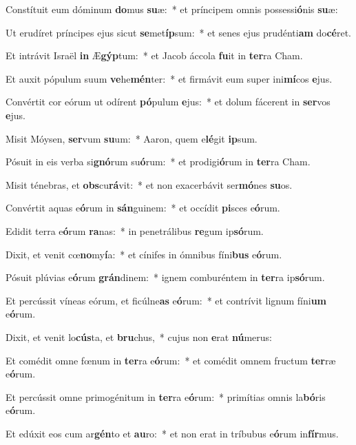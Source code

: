 \item Constítuit eum dóminum \textbf{do}mus \textbf{su}æ:~* et príncipem omnis possessi\textbf{ó}nis \textbf{su}æ:
\item Ut erudíret príncipes ejus sicut \textbf{se}met\textbf{íp}sum:~* et senes ejus prudénti\textbf{am} do\textbf{cé}ret.
\item Et intrávit Israël \textbf{in} Æ\textbf{gýp}tum:~* et Jacob áccola \textbf{fu}it in \textbf{ter}ra Cham.
\item Et auxit pópulum suum \textbf{ve}he\textbf{mén}ter:~* et firmávit eum super ini\textbf{mí}cos \textbf{e}jus.
\item Convértit cor eórum ut odírent \textbf{pó}pulum \textbf{e}jus:~* et dolum fácerent in \textbf{ser}vos \textbf{e}jus.
\item Misit Móysen, \textbf{ser}vum \textbf{su}um:~* Aaron, quem e\textbf{lé}git \textbf{ip}sum.
\item Pósuit in eis verba si\textbf{gnó}rum su\textbf{ó}rum:~* et prodigi\textbf{ó}rum in \textbf{ter}ra Cham.
\item Misit ténebras, et \textbf{obs}cu\textbf{rá}vit:~* et non exacerbávit ser\textbf{mó}nes \textbf{su}os.
\item Convértit aquas e\textbf{ó}rum in \textbf{sán}guinem:~* et occídit \textbf{pi}sces e\textbf{ó}rum.
\item Edidit terra e\textbf{ó}rum \textbf{ra}nas:~* in penetrálibus \textbf{re}gum ip\textbf{só}rum.
\item Dixit, et venit cœ\textbf{no}my\textbf{í}a:~* et cínifes in ómnibus fíni\textbf{bus} e\textbf{ó}rum.
\item Pósuit plúvias e\textbf{ó}rum \textbf{grán}dinem:~* ignem comburéntem in \textbf{ter}ra ip\textbf{só}rum.
\item Et percússit víneas eórum, et ficúlne\textbf{as} e\textbf{ó}rum:~* et contrívit lignum fíni\textbf{um} e\textbf{ó}rum.
\item Dixit, et venit lo\textbf{cús}ta, et \textbf{bru}chus,~* cujus non \textbf{e}rat \textbf{nú}merus:
\item Et comédit omne fœnum in \textbf{ter}ra e\textbf{ó}rum:~* et comédit omnem fructum \textbf{ter}ræ e\textbf{ó}rum.
\item Et percússit omne primogénitum in \textbf{ter}ra e\textbf{ó}rum:~* primítias omnis la\textbf{bó}ris e\textbf{ó}rum.
\item Et edúxit eos cum ar\textbf{gén}to et \textbf{au}ro:~* et non erat in tríbubus e\textbf{ó}rum in\textbf{fír}mus.
